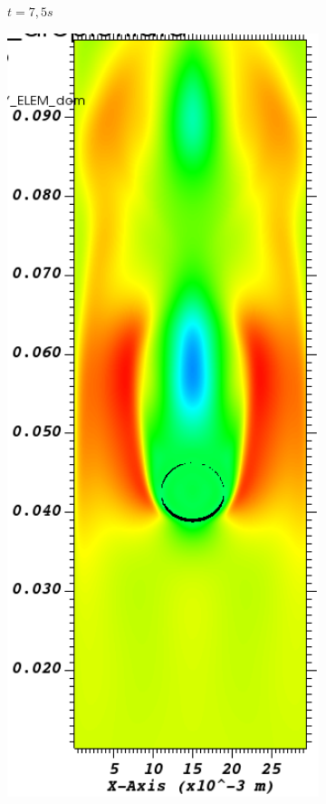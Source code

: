 \begin{figure}[H]
\begin{subfigure}[ht!]{0.18\textwidth}
		\caption{$t=7,5s$}
	\end{subfigure}
	\begin{subfigure}[ht!]{0.18\textwidth}
		\centering
		\includegraphics[width=1\textwidth]{fig_plateau_vitesse2/visit0018.png}

\end{subfigure}
\end{figure}

